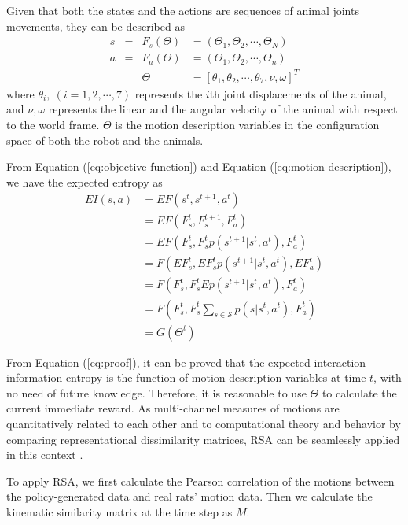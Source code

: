 Given that both the states and the actions are sequences of animal joints
movements, they can be described as
\begin{equation}\label{eq:motion-description}
\begin{aligned}
  s &=& F_s(\Theta) &= (\Theta_1, \Theta_2, \cdots, \Theta_N)\\
  a &=& F_a(\Theta) &= (\Theta_1, \Theta_2, \cdots, \Theta_n)\\
    &&\Theta&=[\theta_1,\theta_2,\cdots,\theta_7,\nu,\omega]^T
\end{aligned}
\end{equation}
where $\theta_i,~(i=1,2,\cdots,7)$ represents the $i$th joint displacements of the
animal, and $\nu,\omega$ represents the linear and the angular velocity of the
animal with respect to the world frame. $\Theta$ is the motion description
variables in the configuration space of both the robot and the animals.

From Equation (\ref{eq:objective-function}) and Equation (\ref{eq:motion-description}),
we have the expected entropy as
\begin{equation}\label{eq:proof}
  \begin{aligned}
    E{I(s,a)}&=EF(s^{t},s^{t+1},a^t)\\
          &=EF(F_s^{t}, F_s^{t+1}, F_a^{t})\\
          &=EF(F_s^{t}, F_s^{t}p(s^{t+1}|s^t,a^t), F_a^{t})\\
          &=F(EF_s^{t}, EF_s^{t}p(s^{t+1}|s^t,a^t), EF_a^{t})\\
          &=F(F_s^{t}, F_s^{t}Ep(s^{t+1}|s^t,a^t), F_a^{t})\\
          &=F(F_s^{t}, F_s^{t}\sum_{s\in\mathcal{S}}p(s|s^t,a^t), F_a^{t})\\
          &=G(\Theta^t)
  \end{aligned}
\end{equation}

From Equation (\ref{eq:proof}), it can be proved that the expected interaction
information entropy is the function of motion description variables at time $t$,
with no need of future knowledge. Therefore, it is reasonable to use $\Theta$ to
calculate the current immediate reward. As multi-channel measures of motions are
quantitatively related to each other and to computational theory and behavior by
comparing representational dissimilarity matrices, RSA can be seamlessly applied
in this context \cite{RSA-intro}.

To apply RSA, we first calculate the Pearson correlation of the motions between
the policy-generated data and real rats' motion data. Then we calculate the
kinematic similarity matrix at the time step as $M$.

